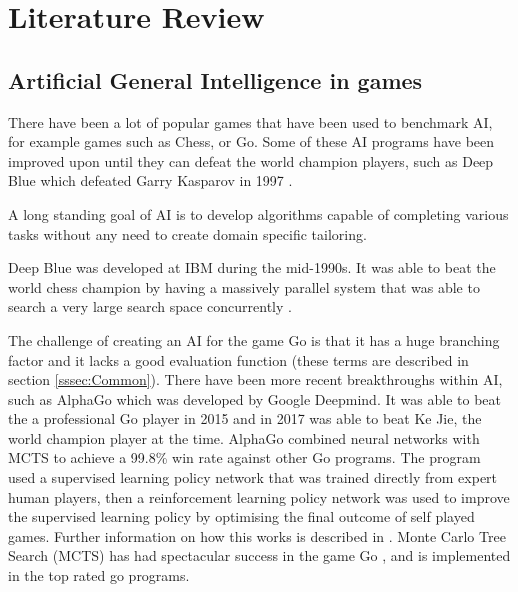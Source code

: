\documentclass[journal]{IEEEtran}
\begin{document}



\section{Literature Review}

	\subsection{Artificial General Intelligence in games}
		
		There have been a lot of popular games that have been used to benchmark AI, for example games such as Chess, or Go. Some of these AI programs have been improved upon until they can defeat the world champion players, such as Deep Blue which defeated Garry Kasparov in 1997 \cite{DeepBlue, shannon1988programming, DeepBlueOverview}. 
		
		A long standing goal of AI is to develop algorithms capable of completing various tasks without any need to create domain specific tailoring.

		Deep Blue was developed at IBM during the mid-1990s. It was able to beat the world chess champion by having a massively parallel system that was able to search a very large search space concurrently \cite{DeepBlue}.

		The challenge of creating an AI for the game Go is that it has a huge branching factor and it lacks a good evaluation function (these terms are described in section \ref{sssec:Common}).
		There have been more recent breakthroughs within AI, such as AlphaGo \cite{silver2016mastering} which was developed by Google Deepmind. It was able to beat the a professional Go player in 2015 and in 2017 was able to beat Ke Jie, the world champion player at the time\cite{silver2016mastering}.
		AlphaGo combined neural networks with MCTS to achieve a 99.8\% win rate against other Go programs. The program used a supervised learning policy network that was trained directly from expert human players, then a reinforcement learning policy network was used to improve the supervised learning policy by optimising the final outcome of self played games. Further information on how this works is described in \cite{silver2016mastering}.
		Monte Carlo Tree Search (MCTS) has had spectacular success in the game Go \cite{browne2012survey}, and is implemented in the top rated go programs.
\end{document}
